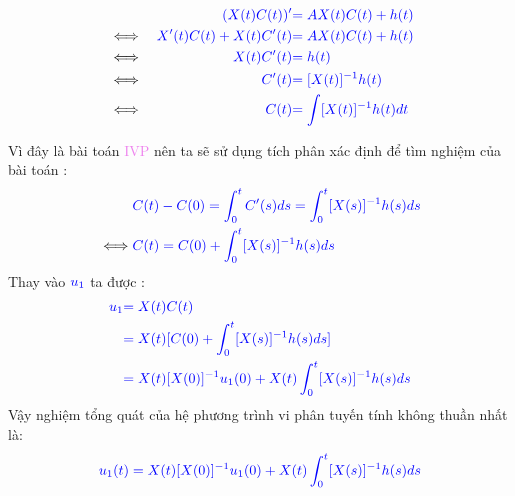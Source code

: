 \documentclass[a4paper]{article}
\begin{document}
\begin{align} 
\notag 
&&\textcolor{blue}{(X(t)C(t))'} &\textcolor{blue}{= A X(t) C(t) + h(t)}\\
\notag
&\iff &\textcolor{blue}{X'(t)C(t)+X(t)C'(t)}& \textcolor{blue}{= A X(t) C(t) + h(t)}\\
\notag
&\iff &\textcolor{blue}{X(t)C'(t)}&\textcolor{blue}{=h(t)}\\
\notag&\iff &\textcolor{blue}{C'(t)}&\textcolor{blue}{=[X(t)]^{-1} h(t)}\\
\notag&\iff &\textcolor{blue}{C(t)}&\textcolor{blue}{= \int [X(t)]^{-1} h(t) dt }
\end{align}

Vì đây là bài toán \textcolor{violet}{IVP} nên ta sẽ sử dụng tích phân xác định để tìm nghiệm của bài toán :
\begin{align}
\notag
&\textcolor{blue}{C(t)-C(0)= \int_{0}^{t} C'(s)ds = \int_{0}^{t} [X(s)]^{-1} h(s)ds }\\
\notag
\iff&\textcolor{blue}{C(t) = C(0) + \int_{0}^{t} [X(s)]^{-1} h(s)ds }
\end{align}
Thay vào $\textcolor{blue}{u_1}$ ta được :
\begin{align}
\notag
\textcolor{blue}{u_1} &\textcolor{blue}{= X(t)C(t)}\\
\notag
&\textcolor{blue}{= X(t) [C(0) + \int_{0}^{t} [X(s)]^{-1} h(s)ds]}\\
\notag
&\textcolor{blue}{= X(t)[X(0)]^{-1}u_1(0) + X(t)\int_{0}^{t} [X(s)]^{-1} h(s)ds}
\end{align} 
Vậy nghiệm tổng quát của hệ phương trình vi phân tuyến tính không thuần nhất là:
\begin{align}
\textcolor{blue}{u_1(t)= X(t)[X(0)]^{-1}u_1(0) + X(t)\int_{0}^{t} [X(s)]^{-1} h(s)ds}
\end{align} 
\end{document}
